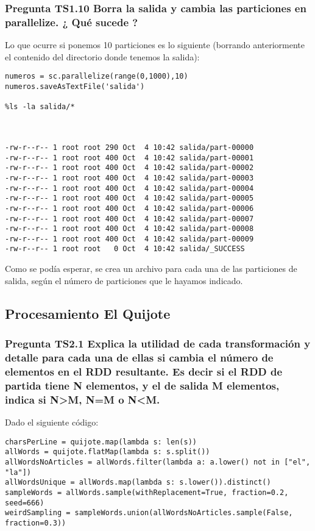 \documentclass[11pt]{article}
\begin{document}
\subsubsection*{ Pregunta TS1.10 Borra la salida y cambia las particiones en parallelize. ¿ Qué sucede ?}

Lo que ocurre si ponemos 10 particiones es lo siguiente (borrando anteriormente el contenido del directorio donde tenemos la salida):

\begin{verbatim}
numeros = sc.parallelize(range(0,1000),10)
numeros.saveAsTextFile('salida')

%ls -la salida/*



-rw-r--r-- 1 root root 290 Oct  4 10:42 salida/part-00000
-rw-r--r-- 1 root root 400 Oct  4 10:42 salida/part-00001
-rw-r--r-- 1 root root 400 Oct  4 10:42 salida/part-00002
-rw-r--r-- 1 root root 400 Oct  4 10:42 salida/part-00003
-rw-r--r-- 1 root root 400 Oct  4 10:42 salida/part-00004
-rw-r--r-- 1 root root 400 Oct  4 10:42 salida/part-00005
-rw-r--r-- 1 root root 400 Oct  4 10:42 salida/part-00006
-rw-r--r-- 1 root root 400 Oct  4 10:42 salida/part-00007
-rw-r--r-- 1 root root 400 Oct  4 10:42 salida/part-00008
-rw-r--r-- 1 root root 400 Oct  4 10:42 salida/part-00009
-rw-r--r-- 1 root root   0 Oct  4 10:42 salida/_SUCCESS
\end{verbatim}

Como se podía esperar, se crea un archivo para cada una de las particiones de salida, según el número de particiones que le hayamos indicado.

\subsection{Procesamiento El Quijote}

\subsubsection*{ Pregunta TS2.1 Explica la utilidad de cada transformación y detalle para cada una de ellas si cambia el número de elementos en el RDD resultante. Es decir si el RDD de partida tiene N elementos, y el de salida M elementos, indica si N>M, N=M o N<M.}

Dado el siguiente código:

\begin{verbatim}
charsPerLine = quijote.map(lambda s: len(s))
allWords = quijote.flatMap(lambda s: s.split())
allWordsNoArticles = allWords.filter(lambda a: a.lower() not in ["el", "la"])
allWordsUnique = allWords.map(lambda s: s.lower()).distinct()
sampleWords = allWords.sample(withReplacement=True, fraction=0.2, seed=666)
weirdSampling = sampleWords.union(allWordsNoArticles.sample(False, fraction=0.3))
\end{verbatim}
\end{document}
